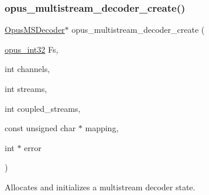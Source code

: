 \subsubsection{\texorpdfstring{opus\+\_\+multistream\+\_\+decoder\+\_\+create()}{opus\_multistream\_decoder\_create()}}
{\footnotesize\ttfamily \hyperlink{group__opus__multistream_gad3497495deb9a8ace82e76cd4f93e0e4}{Opus\+M\+S\+Decoder}$\ast$ opus\+\_\+multistream\+\_\+decoder\+\_\+create (\begin{DoxyParamCaption}\item[{\hyperlink{opus__types_8h_aa4d309d6f80b99dbabebc8f98879ab9a}{opus\+\_\+int32}}]{Fs,  }\item[{int}]{channels,  }\item[{int}]{streams,  }\item[{int}]{coupled\+\_\+streams,  }\item[{const unsigned char $\ast$}]{mapping,  }\item[{int $\ast$}]{error }\end{DoxyParamCaption})}



Allocates and initializes a multistream decoder state. 

